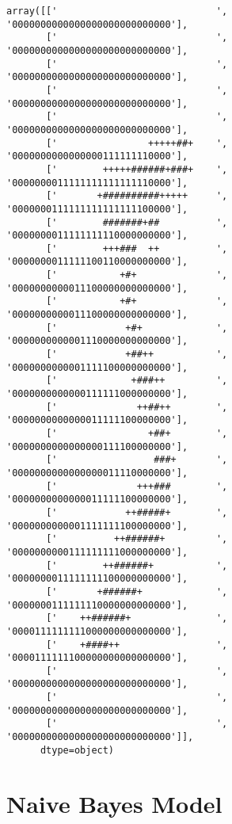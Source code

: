 \documentclass[10pt,parskip=half,
toc=sectionentrywithdots,
bibliography=totocnumbered,
captions=tableheading,numbers=noendperiod]{scrartcl}
\begin{document}
\label{code:example_sym}
\begin{lstlisting}[aboveskip=5pt,basicstyle=\small,belowskip=5pt,breakindent=0pt,language={},numbers=none,postbreak={},xrightmargin=7pt]
array([['                            ', '0000000000000000000000000000'],
       ['                            ', '0000000000000000000000000000'],
       ['                            ', '0000000000000000000000000000'],
       ['                            ', '0000000000000000000000000000'],
       ['                            ', '0000000000000000000000000000'],
       ['                +++++##+    ', '0000000000000000111111110000'],
       ['        +++++######+###+    ', '0000000011111111111111110000'],
       ['       +##########+++++     ', '0000000111111111111111100000'],
       ['        #######+##          ', '0000000011111111110000000000'],
       ['        +++###  ++          ', '0000000011111100110000000000'],
       ['           +#+              ', '0000000000011100000000000000'],
       ['           +#+              ', '0000000000011100000000000000'],
       ['            +#+             ', '0000000000001110000000000000'],
       ['            +##++           ', '0000000000001111100000000000'],
       ['             +###++         ', '0000000000000111111000000000'],
       ['              ++##++        ', '0000000000000011111100000000'],
       ['                +##+        ', '0000000000000000111100000000'],
       ['                 ###+       ', '0000000000000000011110000000'],
       ['              +++###        ', '0000000000000011111100000000'],
       ['            ++#####+        ', '0000000000001111111100000000'],
       ['          ++######+         ', '0000000000111111111000000000'],
       ['        ++######+           ', '0000000011111111100000000000'],
       ['       +######+             ', '0000000111111110000000000000'],
       ['    ++######+               ', '0000111111111000000000000000'],
       ['    +####++                 ', '0000111111100000000000000000'],
       ['                            ', '0000000000000000000000000000'],
       ['                            ', '0000000000000000000000000000'],
       ['                            ', '0000000000000000000000000000']],
      dtype=object)
\end{lstlisting}

\hypertarget{naive-bayes-model}{%
\section{Naive Bayes Model}\label{naive-bayes-model}}
\end{document}
